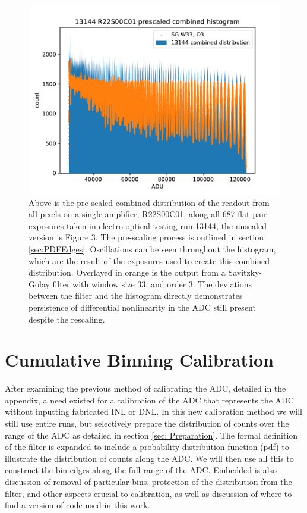 \documentclass[11pt, letterpaper]{article}
\begin{document}
\begin{figure}
    \centering
    \includegraphics[width=0.5\linewidth]{bar13144.pdf}
    \caption{Above is the pre-scaled combined distribution of the readout from all pixels on a single amplifier, R22S00C01, along all 687 flat pair exposures taken in electro-optical testing run 13144, the unscaled version is Figure 3. The pre-scaling process is outlined in section \ref{sec:PDFEdges}. Oscillations can be seen throughout the histogram, which are the result of the exposures used to create this combined distribution. Overlayed in orange is the output from a Savitzky-Golay filter with window size 33, and order 3. The deviations between the filter and the histogram directly demonstrates persistence of differential nonlinearity in the ADC still present despite the rescaling.}
    \label{fig:scaled13144}
\end{figure}

\section{Cumulative Binning Calibration}
\label{sec: Cummulative binning}
\indent


After examining the previous method of calibrating the ADC, detailed in the appendix, a need existed for a calibration of the ADC that represents the ADC without inputting fabricated INL or DNL. 
In this new calibration method we will still use entire runs, but selectively prepare the distribution of counts over the range of the ADC as detailed in section \ref{sec: Preparation}. 
The formal definition of the filter is expanded to include a probability distribution function (pdf) to illustrate the distribution of counts along the ADC. 
We will then use all this to construct the bin edges along the full range of the ADC. 
Embedded is also discussion of removal of particular bins, protection of the distribution from the filter, and other aspects crucial to calibration, as well as discussion of where to find a version of code used in this work.
\end{document}
